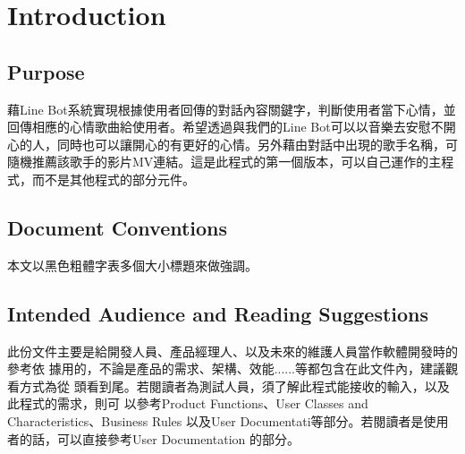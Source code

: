 \documentclass{scrreprt}
\begin{document}
\chapter{Introduction}

\section{Purpose}
\begin{CJK}{UTF8}{<font>}
        藉Line Bot系統實現根據使用者回傳的對話內容關鍵字，判斷使用者當下心情，並回傳相應的心情歌曲給使用者。希望透過與我們的Line Bot可以以音樂去安慰不開心的人，同時也可以讓開心的有更好的心情。另外藉由對話中出現的歌手名稱，可隨機推薦該歌手的影片MV連結。這是此程式的第一個版本，可以自己運作的主程式，而不是其他程式的部分元件。
\end{CJK}

\section{Document Conventions}
\begin{CJK}{UTF8}{<font>}
 本文以黑色粗體字表多個大小標題來做強調。
\end{CJK}

\section{Intended Audience and Reading Suggestions}
\begin{CJK}{UTF8}{<font>}
此份文件主要是給開發人員、產品經理人、以及未來的維護人員當作軟體開發時的參考依
據用的，不論是產品的需求、架構、效能......等都包含在此文件內，建議觀看方式為從
頭看到尾。若閱讀者為測試人員，須了解此程式能接收的輸入，以及此程式的需求，則可
以參考Product Functions、User Classes and Characteristics、Business Rules
以及User Documentati等部分。若閱讀者是使用者的話，可以直接參考User Documentation
的部分。
\end{CJK}
\end{document}
